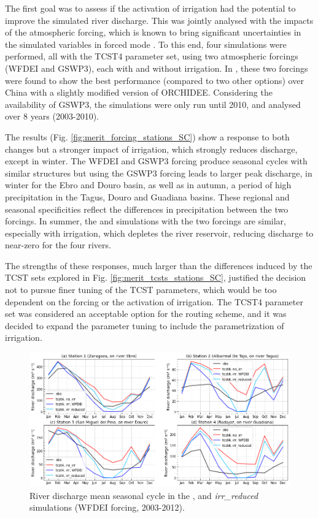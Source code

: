 The first goal was to assess if the activation of irrigation had the potential to improve the simulated river discharge. This was jointly analysed with the impacts of the atmospheric forcing, which is known to bring significant uncertainties in the simulated variables in forced mode \citep{gelati_hydrological_2018,yin_evaluation_2018, tang_impact_2023}.
To this end,  four simulations were performed, all with the TCST4 parameter set, using two atmospheric forcings (WFDEI and GSWP3), each with and without irrigation. In \citet{yin_evaluation_2018}, these two forcings were found to show the best performance (compared to two other options) over China with a slightly modified version of ORCHIDEE. Considering the availability of GSWP3, the simulations were only run until 2010, and analysed over 8 years (2003-2010).

The results (Fig. \ref{fig:merit_forcing_stations_SC}) show a response to both changes but a stronger impact of irrigation, which strongly reduces discharge, except in winter. The WFDEI and GSWP3 forcing produce seasonal cycles with similar structures but using the GSWP3 forcing leads to larger peak discharge, in winter for the Ebro and Douro basin, as well as in autumn, a period of high precipitation in the Tagus, Douro and Guadiana basins. These regional and seasonal specificities reflect the differences in precipitation between the two forcings. 
In summer, the \noirr and \irr simulations with the two forcings are similar, especially with irrigation, which depletes the river reservoir, reducing discharge to near-zero for the four rivers.

The strengths of these responses, much larger than the differences induced by the TCST sets explored in Fig. \ref{fig:merit_tcsts_stations_SC}, justified the decision not to pursue finer tuning of the TCST parameters, which would be too dependent on the forcing or the activation of irrigation. The TCST4 parameter set was considered an acceptable option for the routing scheme, and it was decided to expand the parameter tuning to include the parametrization of irrigation. 

\begin{figure}[htbp]
    \centering
    \includegraphics[width=\textwidth]{images/chap3/river_discharge/merit_irr_4stations_SC.png}
    \caption{River discharge mean seasonal cycle  in the \noirr, \irr and \textit{irr\_reduced} simulations (WFDEI forcing, 2003-2012).}
    \label{fig:merit_irr_stations_SC}
\end{figure}

